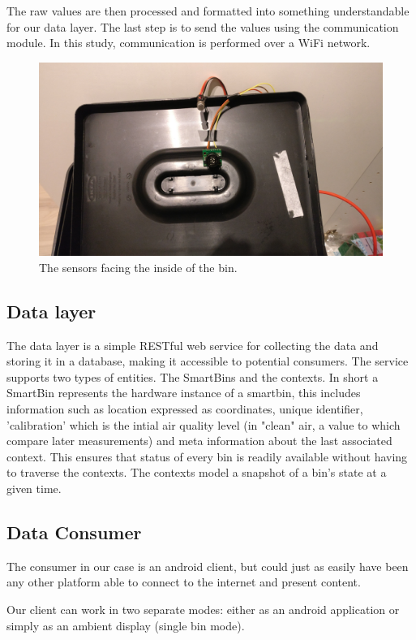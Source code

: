 The raw values are then processed and formatted into something understandable for our data layer.
The last step is to send the values using the communication module.
In this study, communication is performed over a WiFi network.

\begin{figure}
\centering
\includegraphics[scale=.05]{img/IMG_20161130_163302}
\caption{The sensors facing the inside of the bin.}
\label{fig:sensors}
\end{figure}

\subsection{Data layer}
The data layer is a simple RESTful web service for collecting the data and storing it in a database, making it accessible to potential consumers.
The service supports two types of entities. The SmartBins and the contexts.
In short a SmartBin represents the hardware instance of a smartbin, this includes information such as location expressed as coordinates, unique identifier, 'calibration' which is the intial air quality level (in "clean" air, a value to which compare later measurements) and meta information about the last associated context.
This ensures that status of every bin is readily available without having to traverse the contexts.
The contexts model a snapshot of a bin's state at a given time.

\subsection{Data Consumer}
The consumer in our case is an android client, but could just as easily have been any other platform able to connect to the internet and present content.

Our client can work in two separate modes: either as an android application or simply as an ambient display (single bin mode).

